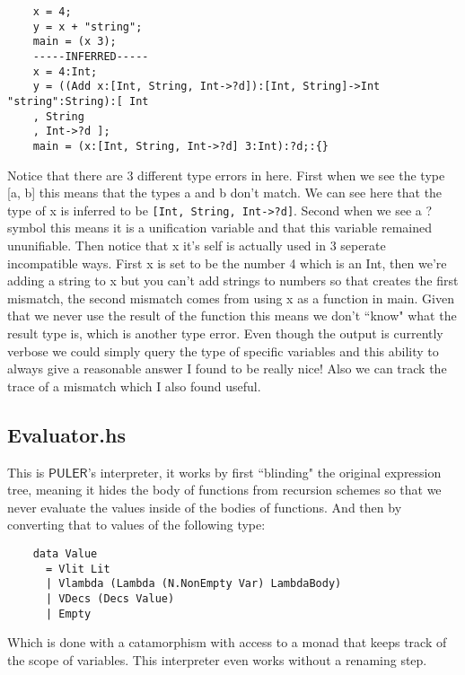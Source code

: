\documentclass{article} %
\newcommand{\PULER}{\mathsf{PULER}}
\begin{document}
    \begin{verbatim}
    x = 4;
    y = x + "string";
    main = (x 3);
    -----INFERRED-----
    x = 4:Int;
    y = ((Add x:[Int, String, Int->?d]):[Int, String]->Int "string":String):[ Int
    , String
    , Int->?d ];
    main = (x:[Int, String, Int->?d] 3:Int):?d;:{}
    \end{verbatim}
    Notice that there are 3 different type errors in here. First when we see the type [a, b] this means that the types a and b don't match. We can see here that the type of x is inferred to be \texttt{[Int, String, Int->?d]}. Second when we see a ? symbol this means it is a unification variable and that this variable remained ununifiable. Then notice that x it's self is actually used in 3 seperate incompatible ways. First x is set to be the number 4 which is an Int, then we're adding a string to x but you can't add strings to numbers so that creates the first mismatch, the second mismatch comes from using x as a function in main. Given that we never use the result of the function this means we don't ``know" what the result type is, which is another type error. Even though the output is currently verbose we could simply query the type of specific variables and this ability to always give a reasonable answer I found to be really nice! Also we can track the trace of a mismatch which I also found useful.
    
    \subsection{Evaluator.hs}
    This is $\PULER$'s interpreter, it works by first ``blinding" the original expression tree, meaning it hides the body of functions from recursion schemes so that we never evaluate the values inside of the bodies of functions. And then by converting that to values of the following type:
    \begin{verbatim}
    data Value
      = Vlit Lit
      | Vlambda (Lambda (N.NonEmpty Var) LambdaBody)
      | VDecs (Decs Value)
      | Empty
    \end{verbatim}
    Which is done with a catamorphism with access to a monad that keeps track of the scope of variables. This interpreter even works without a renaming step.
    \newpage
\end{document}
